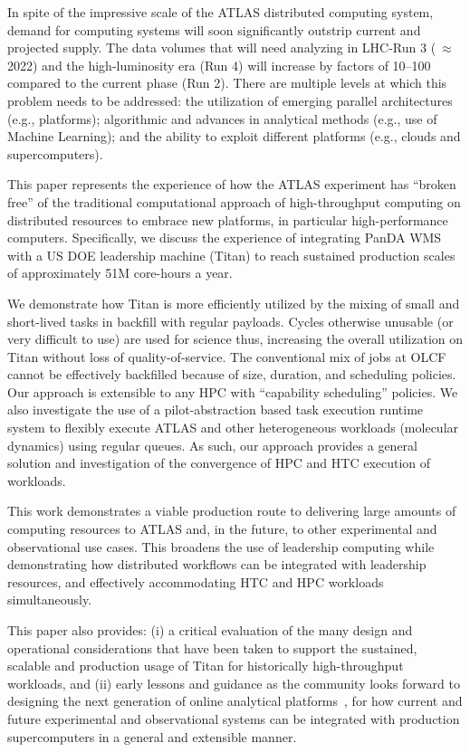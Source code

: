 In spite of the impressive scale of the ATLAS distributed computing system,
demand for computing systems will soon significantly outstrip current and
projected supply.   The data volumes that will need analyzing in LHC-Run 3
($~\approx$ 2022) and the high-luminosity era (Run 4) will increase by
factors of 10--100 compared to the current phase (Run 2). There are multiple
levels at which this problem needs to be addressed: the utilization of
emerging parallel architectures (e.g., platforms); algorithmic and advances
in analytical methods (e.g., use of Machine Learning); and the ability to
exploit different platforms (e.g., clouds and supercomputers).


This paper represents the experience of how the ATLAS experiment has ``broken
free'' of the traditional computational approach of high-throughput computing
on distributed resources to embrace new platforms, in particular
high-performance computers. Specifically, we discuss the experience of
integrating PanDA WMS with a US DOE leadership machine (Titan) to reach
sustained production scales of approximately 51M core-hours a year.

We demonstrate how Titan is more efficiently utilized by the mixing of small
and short-lived tasks in backfill with regular payloads. Cycles otherwise
unusable (or very difficult to use) are used for science thus, increasing the
overall utilization on Titan without loss of quality-of-service. The
conventional mix of jobs at OLCF cannot be effectively backfilled because of
size, duration, and scheduling policies. Our approach is extensible to any
HPC with ``capability scheduling'' policies.  We also investigate the use of
a pilot-abstraction based task execution runtime system to flexibly execute
ATLAS and other heterogeneous workloads (molecular dynamics) using regular
queues. As such, our approach provides a general solution and investigation
of the convergence of HPC and HTC execution of workloads.

This work demonstrates a viable production route to delivering large amounts
of computing resources to ATLAS and, in the future, to other experimental and
observational use cases.  This broadens the use of leadership computing while
demonstrating how distributed workflows can be integrated with leadership
resources, and effectively accommodating HTC and HPC workloads simultaneously. 

This paper also provides: (i) a critical evaluation of the many design and
operational considerations that have been taken to support the sustained,
scalable and production usage of Titan for historically high-throughput
workloads, and (ii) early lessons and guidance as the community looks forward
to designing the next generation of online analytical
platforms~\cite{foap-url}, for how current and future experimental and
observational systems can be integrated with production supercomputers in a
general and extensible manner.
